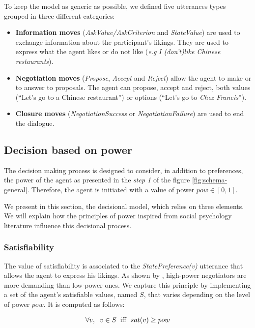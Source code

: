\documentclass[conference, letterpaper]{IEEEtran}
\begin{document}
	To keep the model as generic as possible, we defined five utterances types grouped in three different categories: 
	\begin{itemize}
			\item \textbf{Information moves} (\textit{AskValue/AskCriterion} and \textit{StateValue}) are used to exchange information about the participant's likings. They are used to express what the agent likes or do not like (\emph{e.g} \textit{I (don't)like Chinese restaurants}).
			
			\item 	\textbf{Negotiation moves} (\textit{Propose}, \textit{Accept} and \textit{Reject}) allow the agent to make or to answer to proposals. The agent can propose, accept and reject, both values (``Let's go to a Chinese restaurant'') or options (``Let's go to \emph{Chez Francis}'').	
			
			\item 	\textbf{Closure moves} (\textit{NegotiationSuccess} or \textit{NegotiationFailure}) are used to end the dialogue.
	\end{itemize}

	
	\subsection{Decision based on power}
	\label{sec:dec}
	The decision making process is designed to consider, in addition to preferences, the power of the agent as presented in the \textit{step 1} of the figure \ref{fig:schema-general}. 
	Therefore, the agent is initiated with a value of power $pow \in [0,1]$. 
	
	We present in this section, the decisional model, which relies on three elements. We will explain how the principles of power inspired from social psychology literature influence this decisional process.

	
	\subsubsection{Satisfiability}
	\label{sec:sat}
	The value of satisfiability is associated to the \emph{StatePreference(v)} utterance that allows the agent to express his likings. As shown by \cite{de1995impact}, high-power negotiators are more demanding than low-power ones.
	We capture this principle by implementing a set of the agent's satisfiable values, named $S$, that varies depending on the level of power $pow$. It is computed as follows:

	\begin{equation}
		\forall v,\hspace{2mm} v\in S\hspace{2mm}\mathrm{iff}\hspace{2mm}sat(v) \geq pow
	\end{equation}
	
\end{document}

